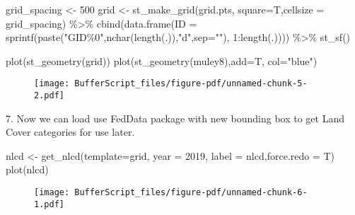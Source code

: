 \documentclass[
  letterpaper,
]{book}
\newenvironment{Shaded}{\begin{snugshade}}{\end{snugshade}}
\newcommand{\AttributeTok}[1]{\textcolor[rgb]{0.40,0.45,0.13}{#1}}
\newcommand{\DecValTok}[1]{\textcolor[rgb]{0.68,0.00,0.00}{#1}}
\newcommand{\FunctionTok}[1]{\textcolor[rgb]{0.28,0.35,0.67}{#1}}
\newcommand{\NormalTok}[1]{\textcolor[rgb]{0.00,0.23,0.31}{#1}}
\newcommand{\OtherTok}[1]{\textcolor[rgb]{0.00,0.23,0.31}{#1}}
\newcommand{\SpecialCharTok}[1]{\textcolor[rgb]{0.37,0.37,0.37}{#1}}
\newcommand{\StringTok}[1]{\textcolor[rgb]{0.13,0.47,0.30}{#1}}
\begin{document}
\begin{Shaded}
\begin{Highlighting}[]
\NormalTok{grid\_spacing }\OtherTok{\textless{}{-}} \DecValTok{500}
\NormalTok{grid }\OtherTok{\textless{}{-}} \FunctionTok{st\_make\_grid}\NormalTok{(grid.pts, }\AttributeTok{square=}\NormalTok{T,}\AttributeTok{cellsize =}\NormalTok{ grid\_spacing) }\SpecialCharTok{\%\textgreater{}\%}
   \FunctionTok{cbind}\NormalTok{(}\FunctionTok{data.frame}\NormalTok{(}\AttributeTok{ID =} \FunctionTok{sprintf}\NormalTok{(}\FunctionTok{paste}\NormalTok{(}\StringTok{"GID\%0"}\NormalTok{,}\FunctionTok{nchar}\NormalTok{(}\FunctionTok{length}\NormalTok{(.)),}\StringTok{"d"}\NormalTok{,}\AttributeTok{sep=}\StringTok{""}\NormalTok{), }\DecValTok{1}\SpecialCharTok{:}\FunctionTok{length}\NormalTok{(.)))) }\SpecialCharTok{\%\textgreater{}\%}
   \FunctionTok{st\_sf}\NormalTok{()}

\FunctionTok{plot}\NormalTok{(}\FunctionTok{st\_geometry}\NormalTok{(grid))}
\FunctionTok{plot}\NormalTok{(}\FunctionTok{st\_geometry}\NormalTok{(muley8),}\AttributeTok{add=}\NormalTok{T, }\AttributeTok{col=}\StringTok{"blue"}\NormalTok{)}
\end{Highlighting}
\end{Shaded}

\begin{figure}[H]

{\centering \texttt{[image: BufferScript\_files/figure-pdf/unnamed-chunk-5-2.pdf]}

}

\end{figure}

7. Now we can load use FedData package with new bounding box to get Land
Cover categories for use later.

\begin{Shaded}
\begin{Highlighting}[]
\NormalTok{nlcd }\OtherTok{\textless{}{-}} \FunctionTok{get\_nlcd}\NormalTok{(}\AttributeTok{template=}\NormalTok{grid, }\AttributeTok{year =} \DecValTok{2019}\NormalTok{, }\AttributeTok{label =} \StringTok{\textquotesingle{}nlcd\textquotesingle{}}\NormalTok{,}\AttributeTok{force.redo =}\NormalTok{ T)}
\FunctionTok{plot}\NormalTok{(nlcd)}
\end{Highlighting}
\end{Shaded}

\begin{figure}[H]

{\centering \texttt{[image: BufferScript\_files/figure-pdf/unnamed-chunk-6-1.pdf]}

}

\end{figure}
\end{document}
